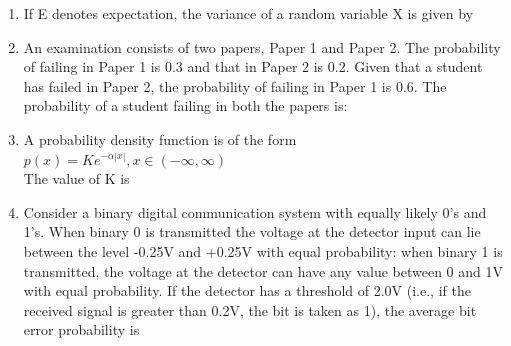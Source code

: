 \documentclass[journal,12pt,twocolumn]{IEEEtran}
\begin{document}
\begin{enumerate}
\item If E denotes expectation, the variance of a random variable X is given by
\begin{enumerate}
\end{enumerate}
%
\solution


\item An examination consists of two papers, Paper 1 and Paper 2. The probability of failing in Paper 1 is 0.3 and that in Paper 2 is 0.2. Given that a student has failed in Paper 2, the probability of failing in Paper 1 is 0.6. The probability  of a student failing in both the papers is:
\begin{enumerate}
\end{enumerate}
%
\solution


\item A probability density function is of the form\\
{\centering $p(\textit{x}) = Ke^{-\alpha |x|}, \textit{x}\in(-\infty,\infty)$\\}
The value of K is 

\begin{enumerate}
\end{enumerate}

\item Consider a binary digital communication system with equally likely 0's and 1's. When binary 0 is transmitted the voltage at the detector input can lie between the level -0.25V and +0.25V with equal probability: when binary 1 is transmitted, the voltage at the detector can have any value between 0 and 1V with equal probability. If the detector has a threshold of 2.0V (i.e., if the received signal is greater than 0.2V, the bit is taken as 1), the average bit error probability is
\begin{enumerate}
\begin{multicols}{4}
\setlength\itemsep{2em}


\end{multicols}
\end{enumerate}
\end{enumerate}
\end{document}
